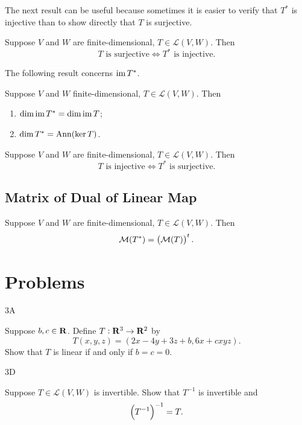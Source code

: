 The next result can be useful because sometimes it is easier to verify that $T^*$ is injective than to show directly that $T$ is surjective.

\begin{proposition}
Suppose $V$ and $W$ are finite-dimensional, $T\in\mathcal{L}(V,W)$. Then
\[T\text{ is surjective}\iff T^*\text{ is injective.}\]
\end{proposition}

The following result concerns $\operatorname{im} T^*$.

\begin{proposition}
Suppose $V$ and $W$ finite-dimensional, $T\in\mathcal{L}(V,W)$. Then
\begin{enumerate}[label=(\roman*)]
\item $\dim\operatorname{im} T^*=\dim\operatorname{im} T$;
\item $\dim T^*=\operatorname{Ann}(\ker T)$.
\end{enumerate}
\end{proposition}

\begin{proposition}
Suppose $V$ and $W$ are finite-dimensional, $T\in\mathcal{L}(V,W)$. Then
\[T\text{ is injective}\iff T^*\text{ is surjective.}\]
\end{proposition}

\subsection{Matrix of Dual of Linear Map}
\begin{proposition}
Suppose $V$ and $W$ are finite-dimensional, $T\in\mathcal{L}(V,W)$. Then
\[\mathcal{M}(T^*)=\left(\mathcal{M}(T)\right)^t.\]
\end{proposition}


\pagebreak

\section*{Problems}
3A
\begin{prbm}
Suppose $b,c\in\mathbf R$. Define $T:\mathbf R^3\to\mathbf R^2$ by
\[T(x,y,z)=(2x-4y+3z+b,6x+cxyz).\]
Show that $T$ is linear if and only if $b=c=0$.
\end{prbm}

\begin{solution}

\end{solution}

3D
\begin{prbm}
Suppose $T\in\mathcal{L}(V,W)$ is invertible. Show that $T^{-1}$ is invertible and
\[\left(T^{-1}\right)^{-1}=T.\]
\end{prbm}

